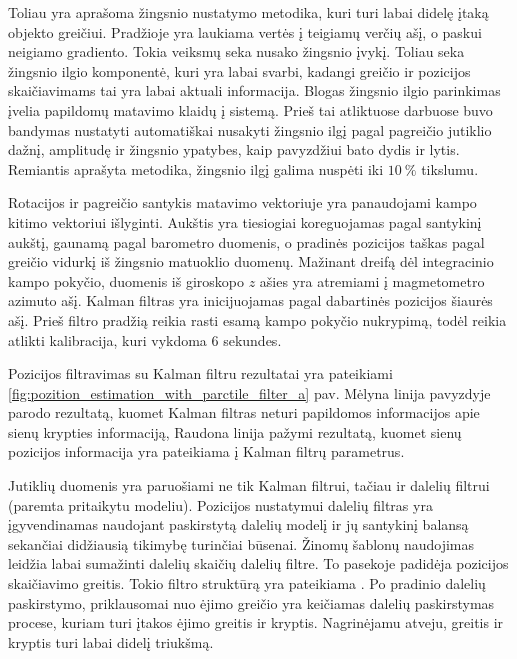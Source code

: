 Toliau yra aprašoma žingsnio nustatymo metodika, kuri turi labai didelę įtaką objekto greičiui. Pradžioje yra laukiama vertės į teigiamų verčių ašį, o paskui neigiamo gradiento. Tokia veiksmų seka nusako žingsnio įvykį. Toliau seka žingsnio ilgio komponentė, kuri yra labai svarbi, kadangi greičio ir pozicijos skaičiavimams tai yra labai aktuali informacija. Blogas žingsnio ilgio parinkimas įvelia papildomų matavimo klaidų į sistemą. Prieš tai atliktuose darbuose \cite{kim2004step, goyal2011strap} buvo bandymas nustatyti automatiškai nusakyti žingsnio ilgį pagal pagreičio jutiklio dažnį, amplitudę ir žingsnio ypatybes, kaip pavyzdžiui bato dydis ir lytis. Remiantis aprašyta metodika, žingsnio ilgį galima nuspėti iki $10~\%$ tikslumu.

Rotacijos ir pagreičio santykis matavimo vektoriuje yra panaudojami kampo kitimo vektoriui išlyginti. Aukštis yra tiesiogiai koreguojamas pagal santykinį aukštį, gaunamą pagal barometro duomenis, o pradinės pozicijos taškas pagal greičio vidurkį iš žingsnio matuoklio duomenų. Mažinant dreifą dėl integracinio kampo pokyčio, duomenis iš giroskopo $z$ ašies yra atremiami į magmetometro azimuto ašį. Kalman filtras yra inicijuojamas pagal dabartinės pozicijos šiaurės ašį. Prieš filtro pradžią reikia rasti esamą kampo pokyčio nukrypimą, todėl reikia atlikti kalibracija, kuri vykdoma 6 sekundes.

Pozicijos filtravimas su Kalman filtru rezultatai yra pateikiami \ref{fig:pozition_estimation_with_parctile_filter_a} pav. Mėlyna linija pavyzdyje parodo rezultatą, kuomet Kalman filtras neturi papildomos informacijos apie sienų krypties informaciją, Raudona linija pažymi rezultatą, kuomet sienų pozicijos informacija yra pateikiama į Kalman filtrų parametrus.

Jutiklių duomenis yra paruošiami ne tik Kalman filtrui, tačiau ir dalelių filtrui (paremta \cite{davidson2010application, pinchin2012particle} pritaikytu modeliu). Pozicijos nustatymui dalelių filtras yra įgyvendinamas naudojant paskirstytą dalelių modelį ir jų santykinį balansą sekančiai didžiausią tikimybę turinčiai būsenai. Žinomų šablonų naudojimas leidžia labai sumažinti dalelių skaičių dalelių filtre. To pasekoje padidėja pozicijos skaičiavimo greitis. Tokio filtro struktūrą yra pateikiama \cite{willemsen2013kalibrierung}. Po pradinio dalelių paskirstymo, priklausomai nuo ėjimo greičio yra keičiamas dalelių paskirstymas procese, kuriam turi įtakos ėjimo greitis ir kryptis. Nagrinėjamu atveju, greitis ir kryptis turi labai didelį triukšmą.

